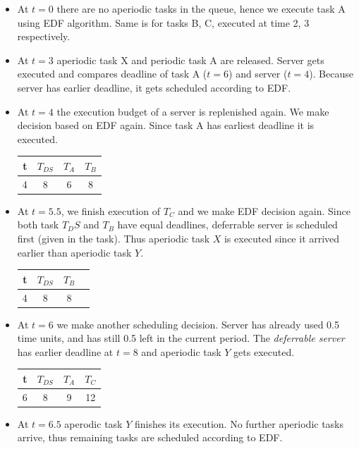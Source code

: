 \documentclass[10pt,a4paper]{article}
\begin{document}
\begin{itemize}
  \item At $t=0$ there are no aperiodic tasks in the queue, hence we execute task A using EDF algorithm. Same is for tasks B, C, executed at time 2, 3 respectively. 
  \item At $t=3$ aperiodic task X and periodic task A are released. Server gets executed and compares deadline of task A ($t=6$) and server ($t=4$). Because server has earlier deadline, it gets scheduled according to EDF.
  \item At $t=4$ the execution budget of a server is replenished again. We make decision based on EDF again. Since task A has earliest deadline it is executed.
\begin{center}
 \begin{tabular}{|c|c|c|c|}
   \hline
    t & $T_{DS}$ & $T_A$ & $T_B$ \\
    \hline
    4 & 8 & 6 & 8 \\
    \hline
 \end{tabular}
\end{center}

\item At $t=5.5$, we finish execution of $T_C$ and we make EDF decision again. Since both task $T_DS$ and $T_B$ have equal deadlines, deferrable server is scheduled first (given in the task). Thus aperiodic task $X$ is executed since it arrived earlier than aperiodic task $Y$. 
\begin{center}
 \begin{tabular}{|c|c|c|c|}
   \hline
    t & $T_{DS}$ & $T_B$  \\
    \hline
    4 & 8 & 8 \\
    \hline
 \end{tabular}
\end{center}

\item At $t=6$ we make another scheduling decision. Server has already used 0.5 time units, and has still 0.5 left in the current period. The \textit{deferrable server} has earlier deadline at $t=8$ and aperiodic task $Y$ gets executed.
\begin{center}
 \begin{tabular}{|c|c|c|c|}
   \hline
    t & $T_{DS}$ & $T_A$ & $T_C$ \\
    \hline
    6 & 8 & 9 & 12 \\
    \hline
 \end{tabular}
\end{center}

\item At $t=6.5$ aperodic task $Y$ finishes its execution. No further aperiodic tasks arrive, thus remaining tasks are scheduled according to EDF.
\end{itemize}
\end{document}
